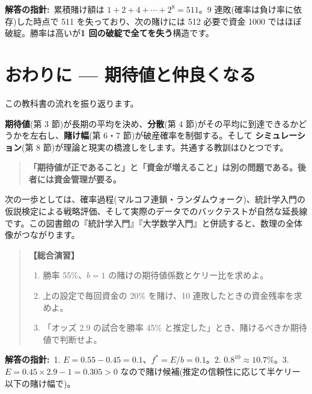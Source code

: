\documentclass{article}
\begin{document}
\textbf{解答の指針:}\ 累積賭け額は \(1 + 2 + 4 + \cdots + 2^8 = 511\)。9 連敗(確率は負け率に依存)した時点で 511 を失っており、次の賭けには 512 必要で資金 1000 ではほぼ破綻。勝率は高いが\textbf{1 回の破綻で全てを失う}構造です。

\section{おわりに — 期待値と仲良くなる}

この教科書の流れを振り返ります。

\textbf{期待値}(第 3 節)が長期の平均を決め、\textbf{分散}(第 4 節)がその平均に到達できるかどうかを左右し、\textbf{賭け幅}(第 6・7 節)が破産確率を制御する。そして \textbf{シミュレーション}(第 8 節)が理論と現実の橋渡しをします。共通する教訓はひとつです。

\begin{quote}
\textbf{「期待値が正であること」と「資金が増えること」は別の問題である。後者には資金管理が要る。}
\end{quote}

次の一歩としては、確率過程(マルコフ連鎖・ランダムウォーク)、統計学入門の仮説検定による戦略評価、そして実際のデータでのバックテストが自然な延長線です。この図書館の『統計学入門』『大学数学入門』と併読すると、数理の全体像がつながります。

\begin{quote}
\textbf{【総合演習】}
\begin{enumerate}
\item 勝率 55\%、\(b = 1\) の賭けの期待値係数とケリー比を求めよ。
\item 上の設定で毎回資金の 20\% を賭け、10 連敗したときの資金残率を求めよ。
\item 「オッズ 2.9 の試合を勝率 45\% と推定した」とき、賭けるべきか期待値で判断せよ。
\end{enumerate}
\end{quote}

\textbf{解答の指針:}\ 1. \(E = 0.55 - 0.45 = 0.1\)、\(f^* = E/b = 0.1\)。2. \(0.8^{10} \approx 10.7\%\)。3. \(E = 0.45 \times 2.9 - 1 = 0.305 > 0\) なので賭け候補(推定の信頼性に応じて半ケリー以下の賭け幅で)。
\end{document}
